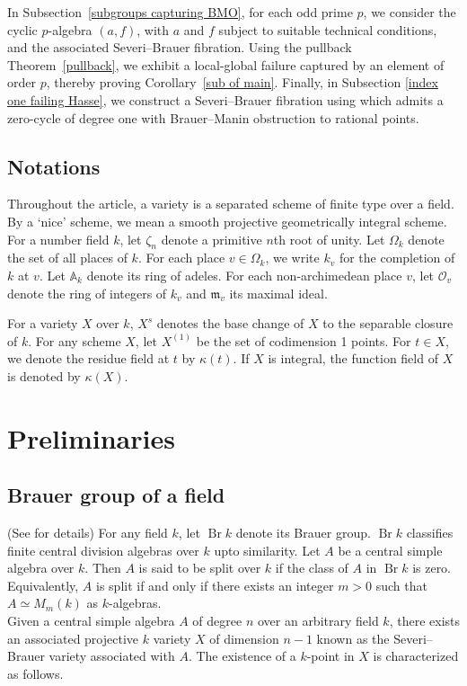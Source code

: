 \documentclass[11pt]{amsart}
\theoremstyle{plain}
\theoremstyle{definition}
\DeclareMathOperator{\Br}{Br}
\begin{document}
In Subsection~\ref{subgroups capturing BMO}, for each odd prime \(p\), we consider the cyclic \(p\)-algebra \((a,f)\), with \(a\) and \(f\) subject to suitable technical conditions, and the associated Severi--Brauer fibration. Using the pullback Theorem~\ref{pullback}, we exhibit a local-global failure captured by an element of order \(p\), thereby proving Corollary~\ref{sub of main}. Finally, in Subsection \ref{index one failing Hasse}, we construct a Severi--Brauer fibration using  which admits a zero-cycle of degree one with Brauer--Manin obstruction to rational points.

\subsection{Notations} Throughout the article, a variety is a separated scheme of finite type over a field. By a `nice' scheme, we mean a smooth projective geometrically integral scheme. For a number field $k$, let $\zeta_n$ denote a primitive $n$th root of unity. Let $\Omega_k$ denote the set of all places of $k$. For each place \(v\in\Omega_k\), we write \(k_v\) for the completion of \(k\) at \(v\). Let \(\mathbb{A}_k\) denote its ring of adeles. For each non-archimedean place \(v\), let \(\mathcal{O}_v\) denote the ring of integers of \(k_v\) and \(\mathfrak{m}_v\) its maximal ideal.

 For a variety $X$ over $k$, $X^s$ denotes the base change of $X$ to the separable closure of $k$. For any scheme \( X \), let \( X^{(1)} \) be the set of codimension 1 points. For \( t \in X \), we denote the residue field at \( t \) by \( \kappa(t) \). If \( X \) is integral, the function field of \( X \) is denoted by \( \kappa(X) \).

\section{Preliminaries} \label{prelim}

    \subsection{Brauer group of a field}(See \cite[Section 2.4]{gs} for details)
	For any field \( k \), let \(\Br k\) denote its Brauer group. $\Br k$ classifies finite central division algebras over $k$ upto similarity. Let $A$ be a central simple algebra over $k$. Then $A$ is said to be split over $k$ if the class of $A$ in $\Br k$ is zero. Equivalently, $A$ is split if and only if there exists an integer $m >0$ such that $A \simeq M_m(k)$ as $k$-algebras. \\
	Given a central simple algebra $A$ of degree $n$ over an arbitrary field $k$, there exists an associated projective $k$ variety $X$ of dimension $n - 1$ known as the Severi--Brauer variety associated with $A$.
	The existence of a $k$-point in $X$ is characterized as follows.
	
\end{document}
